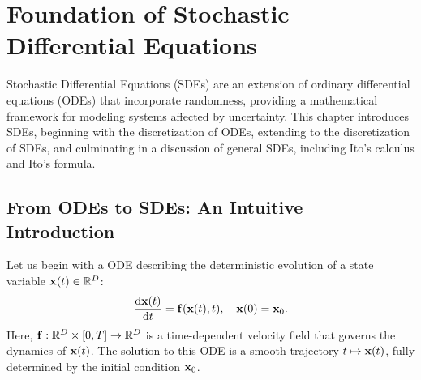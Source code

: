 


\newpage
\clearpage


\section{Foundation of Stochastic Differential Equations}\label{app:sde-intro}

Stochastic Differential Equations (SDEs) are an extension of ordinary differential equations (ODEs) that incorporate randomness, providing a mathematical framework for modeling systems affected by uncertainty. This chapter introduces SDEs, beginning with the discretization of ODEs, extending to the discretization of SDEs, and culminating in a discussion of general SDEs, including Ito's calculus and Ito's formula.

\subsection{From ODEs to SDEs: An Intuitive Introduction}
Let us begin with a ODE describing the deterministic evolution of a state variable $ {\mathbf{x}}(t) \in \mathbb{R}^D $:
\begin{equation}
    \frac{\mathop{}\!\mathrm{d}{\mathbf{x}}(t)}{\mathop{}\!\mathrm{d} t} = {\mathbf{f}}({\mathbf{x}}(t), t), \quad {\mathbf{x}}(0) = {\mathbf{x}}_0.
    \label{eq:ode}
\end{equation}
Here, $ {\mathbf{f}}: \mathbb{R}^D \times [0,T] \rightarrow \mathbb{R}^D $ is a time-dependent velocity field that governs the dynamics of $ {\mathbf{x}}(t) $. The solution to this ODE is a smooth trajectory $ t \mapsto {\mathbf{x}}(t) $, fully determined by the initial condition $ {\mathbf{x}}_0 $.

